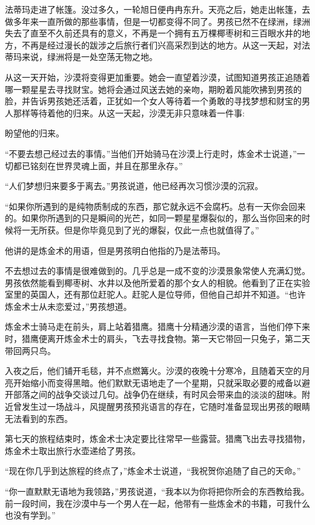 \documentclass[twoside,openany]{book}
\begin{document}
法蒂玛走进了帐篷。没过多久，一轮旭日便冉冉东升。天亮之后，她走出帐篷，去做多年来一直所做的那些事情，但是一切都变得不同了。男孩已然不在绿洲，绿洲失去了直至不久前还具有的意义，不再是一个拥有五万棵椰枣树和三百眼水井的地方，不再是经过漫长的跋涉之后旅行者们兴高采烈到达的地方。从这一天起，对法蒂玛来说，绿洲将是一处空荡无物之地。

从这一天开始，沙漠将变得更加重要。她会一直望着沙漠，试图知道男孩正追随着哪一颗星星去寻找财宝。她将会通过风送去她的亲吻，期盼着风能吹拂到男孩的脸，并告诉男孩她还活着，正犹如一个女人等待着一个勇敢的寻找梦想和财宝的男人那样等待着他的归来。从这一天起，沙漠无非只意味着一件事:

盼望他的归来。

“不要去想己经过去的事情。”当他们开始骑马在沙漠上行走时，炼金术士说道，”一切都已铭刻在世界灵魂上面，并且在那里永存。”

“人们梦想归来要多于离去。”男孩说道，他已经再次习惯沙漠的沉寂。

“如果你所遇到的是纯物质制成的东西，那它就永远不会腐朽。总有一天你会回来的。如果你所遇到的只是瞬间的光芒，如同一颗星星爆裂似的，那么当你回来的时候将一无所获。但是你毕竟见到了光的爆裂，仅此一点也就值得了。”

他讲的是炼金术的用语，但是男孩明白他指的乃是法蒂玛。

不去想过去的事情是很难做到的。几乎总是一成不变的沙漠景象常使人充满幻觉。男孩依然能看到椰枣树、水井以及他所爱着的那个女人的相貌。他看到了正在实验室里的英国人，还有那位赶驼人。赶驼人是位导师，但他自己却并不知道。“也许炼金术士从未恋爱过，”男孩想道。

炼金术士骑马走在前头，肩上站着猎鹰。猎鹰十分精通沙漠的语言，当他们停下来时，猎鹰便离开炼金术士的肩头，飞去寻找食物。第一天它带回一只兔子，第二天带回两只鸟。

入夜之后，他们铺开毛毯，并不点燃篝火。沙漠的夜晚十分寒冷，且随着天空的月亮开始缩小而变得黑暗。他们默默无语地走了一个星期，只就采取必要的戒备以避开部落之间的战争交谈过几句。战争仍在继续，有时风会带来血的淡淡的甜味。附近曾发生过一场战斗，风提醒男孩预兆语言的存在，它随时准备显现出男孩的眼睛无法看到的东西。

第七天的旅程结束时，炼金术士决定要比往常早一些露营。猎鹰飞出去寻找猎物，炼金术士取出旅行水壶递给了男孩。

“现在你几乎到达旅程的终点了，”炼金术士说道，“我祝贺你追随了自己的天命。”

“你一直默默无语地为我领路，”男孩说道，“我本以为你将把你所会的东西教给我。前一段时间，我在沙漠中与一个男人在一起，他带有一些炼金术的书籍，可我什么也没有学到。”
\end{document}
